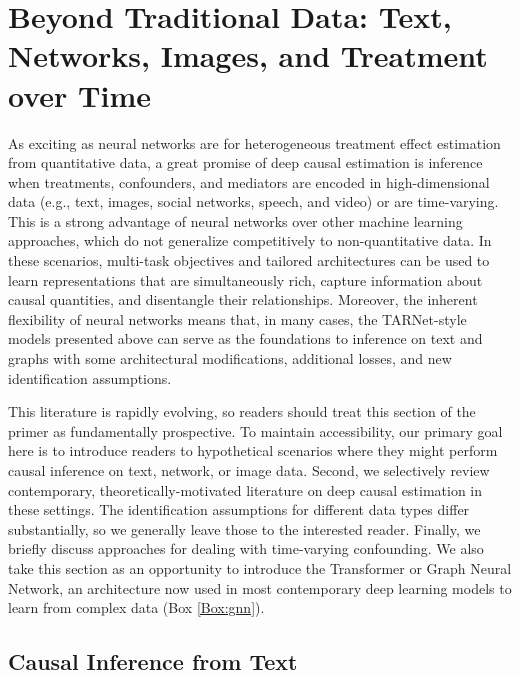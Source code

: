 \section{Beyond Traditional Data: Text, Networks, Images, and Treatment over Time}
\label{section:nontraditional}

As exciting as neural networks are for heterogeneous treatment effect estimation from quantitative data, a great promise of deep causal estimation is inference when treatments, confounders, and mediators are encoded in high-dimensional data (e.g., text, images, social networks, speech, and video) or are time-varying. This is a strong advantage of neural networks over other machine learning approaches, which do not generalize competitively to non-quantitative data.  In these scenarios, multi-task objectives and tailored architectures can be used to learn representations that are simultaneously rich, capture information about causal quantities, and disentangle their relationships. Moreover, the inherent flexibility of neural networks means that, in many cases, the TARNet-style models presented above can serve as the foundations to inference on text and graphs with some architectural modifications, additional losses, and new identification assumptions. 

This literature is rapidly evolving, so readers should treat this section of the primer as fundamentally prospective. To maintain accessibility, our primary goal here is to introduce readers to hypothetical scenarios where they might perform causal inference on text, network, or image data. Second, we selectively review contemporary, theoretically-motivated literature on deep causal estimation in these settings. The identification assumptions for different data types differ substantially, so we generally leave those to the interested reader. Finally, we briefly discuss approaches for dealing with time-varying confounding. We also take this section as an opportunity to introduce the Transformer or Graph Neural Network, an architecture now used in most contemporary deep learning models to learn from complex data (Box \ref{Box:gnn}).
 
\subsection{Causal Inference from Text}
\label{subsection:text}

